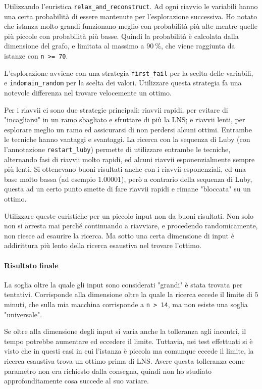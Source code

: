 \documentclass[12pt, a4paper]{article}
\begin{document}
Utilizzando l'euristica \lstinline{relax_and_reconstruct}. Ad ogni riavvio le variabili hanno una certa probabilità di essere mantenute per l'esplorazione successiva.
Ho notato che istanza molto grandi funzionano meglio con probabilità più alte mentre quelle più piccole con probabilità più basse. Quindi la probabilità è calcolata dalla dimensione del grafo, e limitata al massimo a $\qty{90}{\percent}$, che viene raggiunta da istanze con \lstinline{n >= 70}.

L'esplorazione avviene con una strategia \lstinline{first_fail} per la scelta delle variabili, e \lstinline{indomain_random} per la scelta dei valori.
Utilizzare questa strategia fa una notevole differenza nel trovare velocemente un ottimo.

Per i riavvii ci sono due strategie principali: riavvii rapidi, per evitare di "incagliarsi" in un ramo sbagliato e sfruttare di più la LNS; e riavvii lenti, per esplorare meglio un ramo ed assicurarsi di non perdersi alcuni ottimi. Entrambe le tecniche hanno vantaggi e svantaggi.
La ricerca con la sequenza di Luby (con l'annotazione \lstinline{restart_luby}) permette di utilizzare entrambe le tecniche, alternando fasi di riavvii molto rapidi, ed alcuni riavvii esponenzialmente sempre più lenti.
Si ottenevano buoni risultati anche con i riavvii esponenziali, ed una base molto bassa (ad esempio $1.00001$), però a contrario della sequenza di Luby, questa ad un certo punto smette di fare riavvii rapidi e rimane "bloccata" su un ottimo.

Utilizzare queste euristiche per un piccolo input non da buoni risultati. Non solo non si arresta mai perché continuando a riavviare, e procedendo randomicamente, non riesce ad esaurire la ricerca.
Ma sotto una certa dimensione di input è addirittura più lento della ricerca esaustiva nel trovare l'ottimo.

\paragraph{Risultato finale}
La soglia oltre la quale gli input sono considerati "grandi" è stata trovata per tentativi. Corrisponde alla dimensione oltre la quale la ricerca eccede il limite di $5$ minuti, che sulla mia macchina corrisponde a \lstinline{n > 14}, ma non esiste una soglia "universale".

Se oltre alla dimensione degli input si varia anche la tolleranza agli incontri, il tempo potrebbe aumentare ed eccedere il limite. Tuttavia, nei test effettuati si è visto che in questi casi in cui l'istanza è piccola ma comunque eccede il limite, la ricerca esaustiva trova un ottimo prima di LNS.
Avere questa tolleranza come parametro non era richiesto dalla consegna, quindi non ho studiato approfonditamente cosa succede al suo variare.
\end{document}
